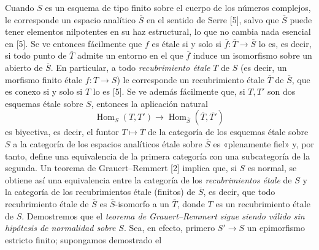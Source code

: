 Cuando $S$ es un esquema de tipo finito sobre el cuerpo de los números
complejos, le corresponde un espacio analítico $\overline S$ en el sentido de
Serre [5], salvo que $\overline S$ puede tener elementos nilpotentes en su haz
estructural, lo que no cambia nada esencial en [5]. Se ve entonces fácilmente
que $f$ es étale si y solo si
$\overline f:\overline T\longrightarrow\overline S$ lo es, es decir, si todo
punto de $\overline T$ admite un entorno en el que $\overline f$ induce un
isomorfismo sobre un abierto de $\overline S$. En particular, a todo
\emph{recubrimiento étale} $T$ de $S$ (es decir, un morfismo finito étale
$f:T\longrightarrow S$) le corresponde un recubrimiento étale $\overline T$ de
$\overline S$, que es conexo si y solo si $T$ lo es [5]. Se ve además
fácilmente que, si $T,T'$ son dos esquemas étale sobre $S$, entonces la
aplicación natural
\[
  \operatorname{Hom}_S(T,T')\longrightarrow
  \operatorname{Hom}_{\overline S}(\overline T,\overline{T'})
\]
es biyectiva, es decir, el funtor $T\longmapsto\overline T$ de la categoría de
los esquemas étale sobre $S$ a la categoría de los espacios analíticos étale
sobre $\overline S$ es «plenamente fiel» y, por tanto, define una equivalencia
de la primera categoría con una subcategoría de la segunda. Un teorema de
Grauert--Remmert [2] implica que, si $S$ es normal, se obtiene así una
equivalencia entre la categoría de los \emph{recubrimientos étale} de $S$ y la
categoría de los recubrimientos étale (finitos) de $\overline S$, es decir, que
todo recubrimiento étale de $\overline S$ es $\overline S$-isomorfo a un
$\overline T$, donde $T$ es un recubrimiento étale de $S$. Demostremos que el
\emph{teorema de Grauert--Remmert sigue siendo válido sin hipótesis de
normalidad sobre $S$}. Sea, en efecto, primero $S'\longrightarrow S$ un
epimorfismo estricto finito; supongamos demostrado el

